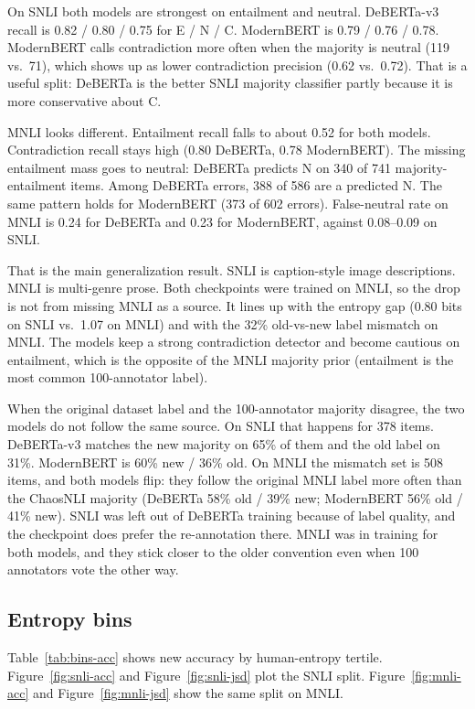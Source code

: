 \documentclass[11pt,a4paper]{article}
\begin{document}
On SNLI both models are strongest on entailment and neutral. DeBERTa-v3 recall is 0.82 / 0.80 / 0.75 for E / N / C. ModernBERT is 0.79 / 0.76 / 0.78. ModernBERT calls contradiction more often when the majority is neutral (119 vs.\ 71), which shows up as lower contradiction precision (0.62 vs.\ 0.72). That is a useful split: DeBERTa is the better SNLI majority classifier partly because it is more conservative about C.

MNLI looks different. Entailment recall falls to about 0.52 for both models. Contradiction recall stays high (0.80 DeBERTa, 0.78 ModernBERT). The missing entailment mass goes to neutral: DeBERTa predicts N on 340 of 741 majority-entailment items. Among DeBERTa errors, 388 of 586 are a predicted N. The same pattern holds for ModernBERT (373 of 602 errors). False-neutral rate on MNLI is 0.24 for DeBERTa and 0.23 for ModernBERT, against 0.08--0.09 on SNLI.

That is the main generalization result. SNLI is caption-style image descriptions. MNLI is multi-genre prose. Both checkpoints were trained on MNLI, so the drop is not from missing MNLI as a source. It lines up with the entropy gap (0.80 bits on SNLI vs.\ 1.07 on MNLI) and with the 32\% old-vs-new label mismatch on MNLI. The models keep a strong contradiction detector and become cautious on entailment, which is the opposite of the MNLI majority prior (entailment is the most common 100-annotator label).

When the original dataset label and the 100-annotator majority disagree, the two models do not follow the same source. On SNLI that happens for 378 items. DeBERTa-v3 matches the new majority on 65\% of them and the old label on 31\%. ModernBERT is 60\% new / 36\% old. On MNLI the mismatch set is 508 items, and both models flip: they follow the original MNLI label more often than the ChaosNLI majority (DeBERTa 58\% old / 39\% new; ModernBERT 56\% old / 41\% new). SNLI was left out of DeBERTa training because of label quality, and the checkpoint does prefer the re-annotation there. MNLI was in training for both models, and they stick closer to the older convention even when 100 annotators vote the other way.

\subsection{Entropy bins}

Table~\ref{tab:bins-acc} shows new accuracy by human-entropy tertile. Figure~\ref{fig:snli-acc} and Figure~\ref{fig:snli-jsd} plot the SNLI split. Figure~\ref{fig:mnli-acc} and Figure~\ref{fig:mnli-jsd} show the same split on MNLI.
\end{document}
